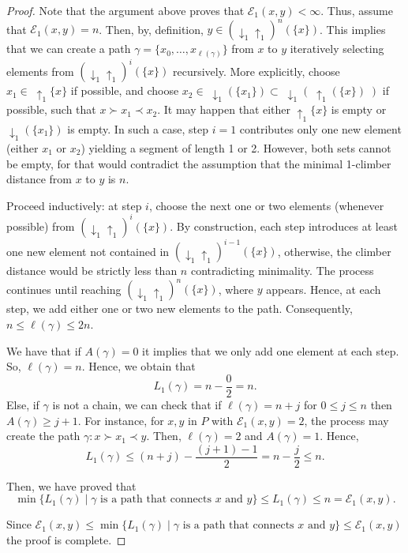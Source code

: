 \documentclass{article}[12pt]
\theoremstyle{exampstyle}
\theoremstyle{remark}
\newcommand{\E}{\mathcal{E}}
\newcommand{\updown}[1][]{\downarrow_{#1} \uparrow_{#1}}
\newcommand{\tuple}[3][1]{#2_{#1}, \dots , #2_{#3}}
\begin{document}
\begin{proof}
    Note that the argument above proves that $\E_1(x,y) < \infty$. Thus, assume that $\E_1(x,y) = n$. Then, by, definition, $y \in (\updown[1])^n(\{x\})$. This implies that we can create a path $\gamma = \{\tuple[0]{x}{\ell(\gamma)}\}$ from $x$ to $y$ iteratively selecting elements from  $(\updown[1])^i(\{x\})$ recursively. More explicitly, choose $x_1 \in \; \uparrow_1 \{x\}$ if possible, and choose $x_2 \in \; \downarrow_1( \{x_1\} ) \subset \; \downarrow_1( \; \uparrow_1(\{x\}) \; )$ if possible, such that $x \succ x_1 \prec x_2$. 
    It may happen that either $\uparrow_1 \{x\}$ is empty or $ \downarrow_1( \{x_1\} )$ is empty. In such a case, step $i=1$ contributes only one new element (either $x_1$ or $x_2$) yielding a segment of length 1 or 2. However, both sets cannot be empty, for that would contradict the assumption that the minimal 1-climber distance from $x$ to $y$ is $n$.
    
    Proceed inductively: at step $i$, choose the next one or two elements (whenever possible) from $(\updown[1])^i(\{x\})$. By construction, each step introduces at least one new element not contained in $(\updown[1])^{i-1}(\{x\})$, otherwise, the climber distance would be strictly less than $n$ contradicting minimality. The process continues until reaching  $(\updown[1])^{n}(\{x\})$, where $y$ appears. Hence, at each step, we add either one or two new elements to the path. Consequently, $ n \leq \ell(\gamma) \leq 2n$.
    
    We have that if $A(\gamma) = 0 $ it implies that we only add one element at each step. So, $\ell(\gamma) = n $. 
    Hence, we obtain that
    \begin{equation*}
        L_1(\gamma) = n  - \frac{0}{2} = n.
    \end{equation*}
    Else, if $\gamma$ is not a chain, we can check that if $\ell(\gamma) = n + j$ for $ 0 \leq j \leq n$ then $A(\gamma) \geq j+1$. For instance, for $x,y$ in $P$ with  $\E_1(x,y) = 2$, the process may create the path $\gamma: x \succ x_1 \prec y$. Then, $\ell(\gamma) = 2 $ and $A(\gamma) = 1$.
    Hence, 
    \begin{equation*}
        L_1(\gamma) \leq (n + j) - \frac{(j+1)-1}{2} = n - \frac{j}{2} \leq n. 
    \end{equation*}

    Then, we have proved that 
    \begin{equation*}
        \min \{ L_1(\gamma) \mid \gamma \text { is a path that connects } x \text{ and } y\} \leq L_1(\gamma) \leq n = \E_1(x,y).
    \end{equation*}

    Since $\E_1(x,y) \leq \min \{ L_1(\gamma) \mid \gamma \text { is a path that connects } x \text{ and } y\} \leq \E_1(x,y)$ the proof is complete. 
\end{proof}
\end{document}
